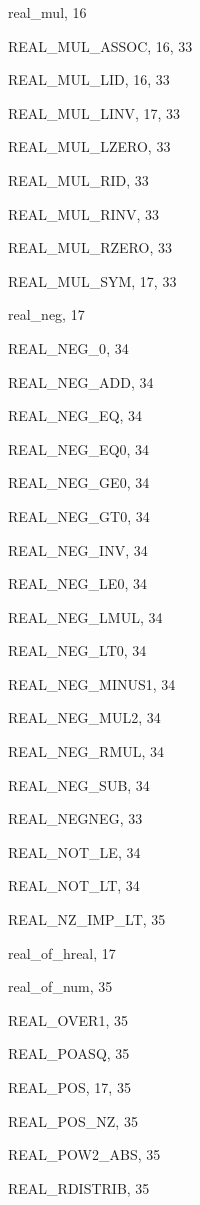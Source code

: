 \begin{theindex}
  \item {\ptt real\_mul}, 16
  \item {\ptt REAL\_MUL\_ASSOC}, 16, 33
  \item {\ptt REAL\_MUL\_LID}, 16, 33
  \item {\ptt REAL\_MUL\_LINV}, 17, 33
  \item {\ptt REAL\_MUL\_LZERO}, 33
  \item {\ptt REAL\_MUL\_RID}, 33
  \item {\ptt REAL\_MUL\_RINV}, 33
  \item {\ptt REAL\_MUL\_RZERO}, 33
  \item {\ptt REAL\_MUL\_SYM}, 17, 33
  \item {\ptt real\_neg}, 17
  \item {\ptt REAL\_NEG\_0}, 34
  \item {\ptt REAL\_NEG\_ADD}, 34
  \item {\ptt REAL\_NEG\_EQ}, 34
  \item {\ptt REAL\_NEG\_EQ0}, 34
  \item {\ptt REAL\_NEG\_GE0}, 34
  \item {\ptt REAL\_NEG\_GT0}, 34
  \item {\ptt REAL\_NEG\_INV}, 34
  \item {\ptt REAL\_NEG\_LE0}, 34
  \item {\ptt REAL\_NEG\_LMUL}, 34
  \item {\ptt REAL\_NEG\_LT0}, 34
  \item {\ptt REAL\_NEG\_MINUS1}, 34
  \item {\ptt REAL\_NEG\_MUL2}, 34
  \item {\ptt REAL\_NEG\_RMUL}, 34
  \item {\ptt REAL\_NEG\_SUB}, 34
  \item {\ptt REAL\_NEGNEG}, 33
  \item {\ptt REAL\_NOT\_LE}, 34
  \item {\ptt REAL\_NOT\_LT}, 34
  \item {\ptt REAL\_NZ\_IMP\_LT}, 35
  \item {\ptt real\_of\_hreal}, 17
  \item {\ptt real\_of\_num}, 35
  \item {\ptt REAL\_OVER1}, 35
  \item {\ptt REAL\_POASQ}, 35
  \item {\ptt REAL\_POS}, 17, 35
  \item {\ptt REAL\_POS\_NZ}, 35
  \item {\ptt REAL\_POW2\_ABS}, 35
  \item {\ptt REAL\_RDISTRIB}, 35

\end{theindex}

